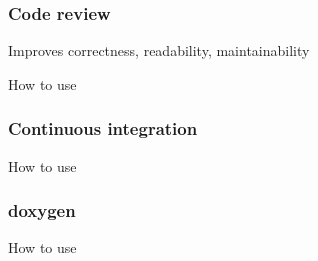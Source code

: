 \documentclass{beamer}
\begin{document}
\begin{frame}
\frametitle{Code review}
Improves correctness, readability, maintainability
\begin{exampleblock}{How to use}
\end{exampleblock}
\end{frame}

\begin{frame}
\frametitle{Continuous integration}
\begin{exampleblock}{How to use}
\end{exampleblock}
\end{frame}

\begin{frame}
\frametitle{doxygen}
\begin{exampleblock}{How to use}
\end{exampleblock}
\end{frame}
\end{document}
